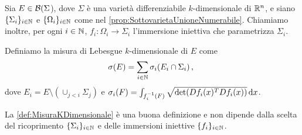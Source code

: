 \begin{definition}\label{def:MisuraKDimensionale}
	Sia $E\in\mathcal B(\Sigma$), dove $\Sigma$ è una varietà differenziabile $k$-dimensionale di $\mathbb R^n$, e siano $\{\Sigma_i\}_{i\in\mathbb N}$ e $\{\Omega_i\}_{i\in\mathbb N}$ come nel \cref{prop:SottovarietaUnioneNumerabile}. Chiamiamo inoltre, per ogni $i\in\mathbb N$, $f_i:\Omega_i\to\Sigma_i$ l'immersione iniettiva che parametrizza $\Sigma_i$.
	
	Definiamo la misura di Lebesgue $k$-dimensionale di $E$ come
	\begin{equation*}
		\sigma(E)=\sum_{i\in\mathbb N} \sigma_i(E_i\cap \Sigma_i)\, \text{, }
	\end{equation*}
	dove $E_i=E\setminus (\cup_{j<i}\Sigma_j)$ e $\sigma_i(F)=\int_{f_i^{-1}(F)}\sqrt{\det(Df_i(x)^TDf_i(x))} \,\mathrm d x$.
\end{definition}
\begin{remark}
	La \cref{def:MisuraKDimensionale} è una buona definizione e non dipende dalla scelta del ricoprimento $\{\Sigma_i\}_{i\in\mathbb N}$ e delle immersioni iniettive $\{f_i\}_{i\in\mathbb N}$.
\end{remark}
